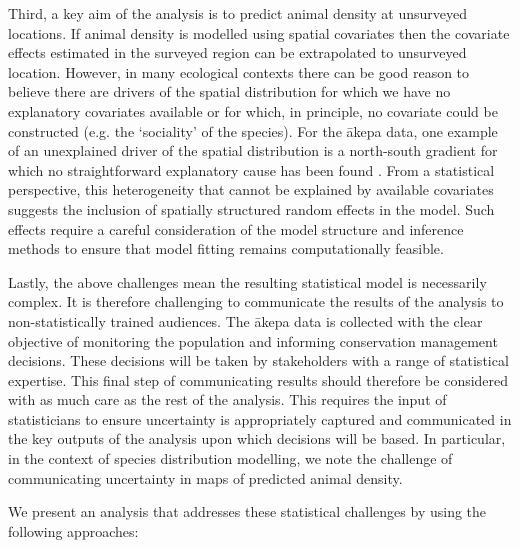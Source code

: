 \documentclass{stylefile16/statsoc}
\newcommand{\akepa}{\textquotesingle\={a}kepa}  %
\begin{document}
Third, a key aim of the analysis is to predict animal density at unsurveyed locations.  If animal density is modelled using spatial covariates then the covariate effects estimated in the surveyed region can be extrapolated to unsurveyed location.  However, in many ecological contexts there can be good reason to believe there are drivers of the spatial distribution for which we have no explanatory covariates available or for which, in principle, no covariate could be constructed (e.g. the `sociality' of the species).  For the \akepa{} data, one example of an unexplained driver of the spatial distribution is a north-south gradient for which no straightforward explanatory cause has been found \cite{camp_dsm_2020}.  From a statistical perspective, this heterogeneity that cannot be explained by available covariates suggests the inclusion of spatially structured random effects in the model.  Such effects require a careful consideration of the model structure and inference methods to ensure that model fitting remains computationally feasible.

Lastly, the above challenges mean the resulting statistical model is necessarily complex. It is therefore challenging to communicate the results of the analysis to non-statistically trained audiences.  The \akepa{} data is collected with the clear objective of monitoring the population and informing conservation management decisions.  These decisions will be taken by stakeholders with a range of statistical expertise.  This final step of communicating results should therefore be considered with as much care as the rest of the analysis.  This requires the input of statisticians to ensure uncertainty is appropriately captured and communicated in the key outputs of the analysis upon which decisions will be based.  In particular, in the context of species distribution modelling, we note the challenge of communicating uncertainty in maps of predicted animal density.

We present an analysis that addresses these statistical challenges by using the following approaches:
\end{document}
